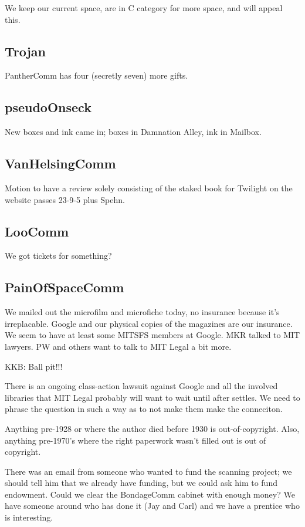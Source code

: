 \documentclass[10pt]{article}
\newcommand{\ps}{ plus Spehn\xspace}
\begin{document}
We keep our current space, are in C category for more space, and will appeal this.

\subsection*{Trojan}

PantherComm has four (secretly seven) more gifts.

\subsection*{pseudoOnseck}

New boxes and ink came in; boxes in Damnation Alley, ink in Mailbox.

\subsection*{VanHelsingComm}

Motion to have a review solely consisting of the staked book for Twilight on the website passes 23-9-5\ps.

\subsection*{LooComm}

We got tickets for something?

\subsection*{PainOfSpaceComm}

We mailed out the microfilm and microfiche today, no insurance because it's irreplacable.  Google and our physical copies of the magazines are our insurance.  We seem to have at least some MITSFS members at Google.  MKR talked to MIT lawyers.  PW and others want to talk to MIT Legal a bit more.

KKB: Ball pit!!!

There is an ongoing class-action lawsuit against Google and all the involved libraries that MIT Legal probably will want to wait until after settles.  We need to phrase the question in such a way as to not make them make the conneciton.

Anything pre-1928 or where the author died before 1930 is out-of-copyright.  Also, anything pre-1970's where the right paperwork wasn't filled out is out of copyright.

There was an email from someone who wanted to fund the scanning project; we should tell him that we already have funding, but we could ask him to fund endowment.  Could we clear the BondageComm cabinet with enough money?  We have someone around who has done it (Jay and Carl) and we have a prentice who is interesting.
\end{document}
